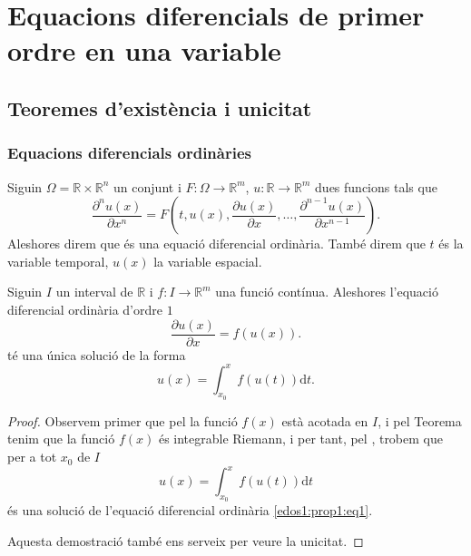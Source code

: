 \documentclass[../Apunts.tex]{subfiles}
\begin{document}
\chapter{Equacions diferencials de primer ordre en una variable}
	\section{Teoremes d'existència i unicitat}
	\subsection{Equacions diferencials ordinàries}
	\begin{definition}
		\label{def:equació diferencial ordinària d'ordre n}
		\label{def:solució de l'equació diferencial ordinària}
		Siguin \(\Omega=\mathbb{R}\times\mathbb{R}^{n}\) un conjunt i \(F\colon\Omega\longrightarrow\mathbb{R}^{m}\), \(u\colon\mathbb{R}\longrightarrow\mathbb{R}^{m}\) dues funcions tals que
		\[\frac{\partial^{n}u(x)}{\partial x^{n}}=F\left(t,u(x),\frac{\partial u(x)}{\partial x},\dots,\frac{\partial^{n-1}u(x)}{\partial x^{n-1}}\right).\]
		Aleshores direm que
		és una equació diferencial ordinària. També direm que \(t\) és la variable temporal, \(u(x)\) la variable espacial.
	\end{definition}
	\begin{proposition}
		\label{prop:edos1:1}
		Siguin \(I\) un interval de \(\mathbb{R}\) i \(f\colon I\longrightarrow\mathbb{R}^{m}\) una funció contínua. Aleshores l'equació diferencial ordinària d'ordre \(1\)
		\begin{equation}
			\label{edos1:prop1:eq1}
			\frac{\partial u(x)}{\partial x}=f(u(x)).
		\end{equation}
		té una única solució de la forma
		\[u(x)=\int_{x_{0}}^{x}f(u(t))\text{d}t.\]
		\begin{proof}
			Observem primer que pel  la funció \(f(x)\) està acotada en \(I\), i pel Teorema  tenim que la funció \(f(x)\) és integrable Riemann, i per tant, pel , trobem que per a tot \(x_{0}\) de \(I\)
			\[u(x)=\int_{x_{0}}^{x}f(u(t))\text{d}t\]
			és una solució de l'equació diferencial ordinària \eqref{edos1:prop1:eq1}.
			
			Aquesta demostració també ens serveix per veure la unicitat.
		\end{proof}
	\end{proposition}
\end{document}
